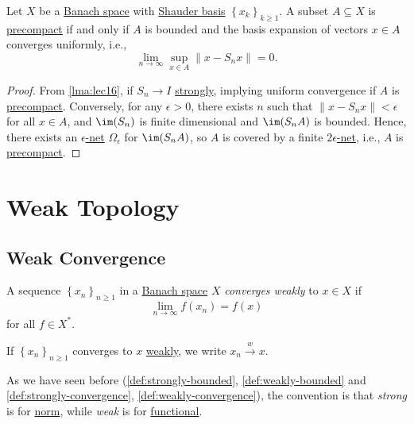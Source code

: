 \begin{corollary}
	Let \(X\) be a \hyperref[def:Banach-space]{Banach space} with \hyperref[def:Schauder-basis]{Shauder basis} \(\left\{ x_k \right\}_{k \geq 1} \). A subset \(A \subseteq X\) is \hyperref[def:precompact]{precompact} if and only if \(A\) is bounded and the basis expansion of vectors \(x\in A\) converges uniformly, i.e.,
	\[
		\lim_{n \to \infty} \sup _{x\in A} \left\lVert x - S_n x\right\rVert = 0.
	\]
\end{corollary}
\begin{proof}
	From \autoref{lma:lec16}, if \(S_n \to I\) \hyperref[def:strongly-convergence]{strongly}, implying uniform convergence if \(A\) is \hyperref[def:precompact]{precompact}. Conversely, for any \(\epsilon > 0\), there exists \(n\) such that \(\left\lVert x - S_n x\right\rVert < \epsilon \) for all \(x\in A\), and \(\im (S_n)\)  is finite dimensional and \(\im(S_n A)\) is bounded. Hence, there exists an \hyperref[def:eps-net]{\(\epsilon \)-net} \(\Omega _\epsilon \) for \(\im(S_n A)\), so \(A\) is covered by a finite \hyperref[def:eps-net]{\(2\epsilon \)-net}, i.e., \(A\) is \hyperref[def:precompact]{precompact}.
\end{proof}

\section{Weak Topology}
\subsection{Weak Convergence}
\begin{definition}\label{def:weakly-convergence}
	A sequence \(\left\{ x_n \right\} _{n\geq 1}\) in a \hyperref[def:Banach-space]{Banach space} \(X\) \emph{converges weakly} to \(x\in X\) if
	\[
		\lim_{n \to \infty} f(x_n) = f(x)
	\]
	for all \(f\in X^{\ast} \).
\end{definition}

\begin{notation}
	If \(\left\{ x_n \right\} _{n \geq 1}\) converges to \(x\) \hyperref[def:weakly-convergence]{weakly}, we write \(x_n \overset{w}{\to } x\).
\end{notation}

\begin{remark}
	As we have seen before (\autoref{def:strongly-bounded}, \autoref{def:weakly-bounded} and \autoref{def:strongly-convergence}, \autoref{def:weakly-convergence}), the convention is that \emph{strong} is for \hyperref[def:norm]{norm}, while \emph{weak} is for \hyperref[def:linear-functional]{functional}.
\end{remark}

